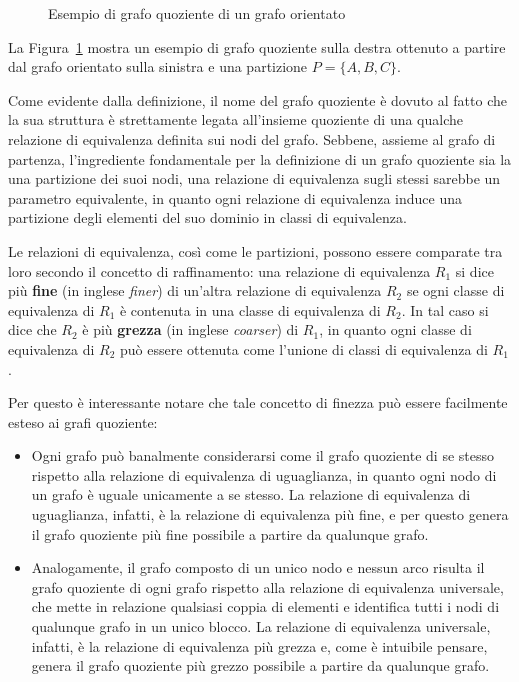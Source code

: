 \begin{figure}[h]
    \centering
    
    \caption{Esempio di grafo quoziente di un grafo orientato}
    \label{fig:quotient-graph-example}
\end{figure}

La Figura~\ref{fig:quotient-graph-example} mostra un esempio di grafo quoziente sulla destra ottenuto a partire dal
grafo orientato sulla sinistra e una partizione $P = \{A, B, C\}$. \newline

Come evidente dalla definizione, il nome del grafo quoziente \`e dovuto al fatto che la sua struttura \`e
strettamente legata all'insieme quoziente di una qualche relazione di equivalenza definita sui nodi del grafo.
Sebbene, assieme al grafo di partenza, l'ingrediente fondamentale per la definizione di un grafo quoziente sia la
una partizione dei suoi nodi, una relazione di equivalenza sugli stessi sarebbe un parametro equivalente, in quanto
ogni relazione di equivalenza induce una partizione degli elementi del suo dominio in classi di equivalenza.

Le relazioni di equivalenza, così come le partizioni, possono essere comparate tra
loro secondo il concetto di raffinamento: una relazione di equivalenza $R_1$ si dice più \textbf{fine}
(in inglese \textit{finer}) di un'altra relazione di equivalenza $R_2$ se ogni classe di equivalenza di $R_1$ \`e
contenuta in una classe di equivalenza di $R_2$.
In tal caso si dice che $R_2$ \`e più \textbf{grezza} (in inglese \textit{coarser}) di $R_1$, in quanto ogni classe
di equivalenza di $R_2$ pu\`o essere ottenuta come l'unione di classi di equivalenza di $R_1$. \newline

Per questo \`e interessante notare che tale concetto di finezza pu\`o essere facilmente esteso ai grafi quoziente:
\begin{itemize}
    \item Ogni grafo pu\`o banalmente considerarsi come il grafo quoziente di se stesso rispetto
    alla relazione di equivalenza di uguaglianza, in quanto ogni nodo di un grafo \`e uguale unicamente a se stesso.
    La relazione di equivalenza di uguaglianza, infatti, \`e la relazione di equivalenza pi\`u fine, e per questo
    genera il grafo quoziente pi\`u fine possibile a partire da qualunque grafo.
    \item Analogamente, il grafo composto di un unico nodo e nessun arco risulta il grafo quoziente di ogni grafo
    rispetto alla relazione di equivalenza universale, che mette in relazione qualsiasi coppia di elementi e
    identifica tutti i nodi di qualunque grafo in un unico blocco.
    La relazione di equivalenza universale, infatti, \`e la relazione di equivalenza pi\`u grezza e, come \`e
    intuibile pensare, genera il grafo quoziente pi\`u grezzo possibile a partire da qualunque grafo.
\end{itemize}


